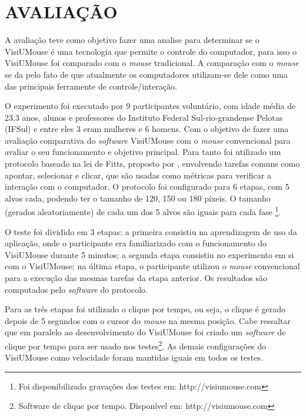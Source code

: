 \chapter{AVALIAÇÃO}\label{CAP7}
A avaliação teve como objetivo fazer uma analise para determinar se o VisiUMouse é uma tecnologia que permite o controle do computador, para isso o VisiUMouse foi comparado com o \textit{mouse} tradicional. A comparação com o \textit{mouse} se da pelo fato de que atualmente os computadores utilizam-se dele como uma das principais ferramente de controle/interação.

O experimento foi executado por 9 participantes voluntário, com idade média de 23,3 anos, alunos e professores do Instituto Federal Sul-rio-grandense Pelotas (IFSul) e entre eles 3 eram mulheres e 6 homens. Com o objetivo de fazer uma avaliação comparativa do \textit{software} VisiUMouse com o \textit{mouse} convencional para avaliar o seu funcionamento e objetivo principal. Para tanto foi utilizado um protocolo baseado na lei de Fitts, proposto por , envolvendo tarefas comuns como apontar, selecionar e clicar, que são usadas como métricas para verificar a interação com o computador. O protocolo foi configurado para 6 etapas, com 5 alvos cada, podendo ter o tamanho de 120, 150 ou 180 píxeis. O tamanho (gerados aleatoriamente) de cada um dos 5 alvos são iguais para cada fase \footnote{Foi disponibilizado gravações dos testes em: http://visiumouse.com}.

O teste foi dividido em 3 etapas: a primeira consistiu na aprendizagem de uso da aplicação, onde o participante era familiarizado com o funcionamento do VisiUMouse durante 5 minutos; a segunda etapa consistiu no experimento em si com o VisiUMouse; na última etapa, o participante utilizou o \textit{mouse} convencional para a execução das mesmas tarefas da etapa anterior. Os resultados são computados pelo \textit{software} do protocolo.

Para as três etapas foi utilizado o clique por tempo, ou seja, 
o clique é gerado depois de 5 segundos com o cursor do \textit{mouse} na mesma posição. Cabe ressaltar que em paralelo ao desenvolvimento do VisiUMouse foi criado um \textit{software} de clique por tempo para ser usado nos testes\footnote{Software de clique por tempo. Disponível em: http://visiumouse.com}. As demais configurações do VisiUMouse como velocidade foram mantidas iguais em todos os testes.  

